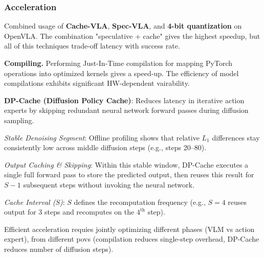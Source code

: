 \subsubsection{Acceleration}
\begin{dashlist}
    \item Combined usage of \textbf{Cache-VLA}, \textbf{Spec-VLA}, and \textbf{4-bit quantization} on OpenVLA. The combination "speculative + cache" gives the highest speedup, but all of this techniques trade-off latency with success rate.
    \item \textbf{Compiling.} Performing Just-In-Time compilation for mapping PyTorch operations into optimized kernels gives a speed-up. The efficiency of model compilations exhibits significant HW-dependent vairability.
    \item \textbf{DP-Cache (Diffusion Policy Cache)}: Reduces latency in iterative action experts by skipping redundant neural network forward passes during diffusion sampling.
    \begin{dashlist}
        \item \textit{Stable Denoising Segment}: Offline profiling shows that relative $L_1$ differences stay consistently low across middle diffusion steps (e.g., steps 20--80).
        \item \textit{Output Caching \& Skipping}: Within this stable window, DP-Cache executes a single full forward pass to store the predicted output, then reuses this result for $S-1$ subsequent steps without invoking the neural network.
        \item \textit{Cache Interval ($S$)}: $S$ defines the recomputation frequency (e.g., $S=4$ reuses output for 3 steps and recomputes on the $4^{\text{th}}$ step).
    \end{dashlist}

    \item Efficient acceleration requies jointly optimizing different phases (VLM vs action expert), from different povs (compilation reduces single-step overhead, DP-Cache reduces number of diffusion steps).
    

\end{dashlist}
